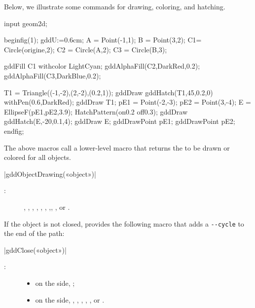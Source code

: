 \documentclass[a4paper,english]{article}
\begin{document}
Below, we illustrate some commands for drawing, coloring, and hatching.

\begin{ExempleMP}
input geom2d;

beginfig(1);
gddU:=0.6cm;
A = Point(-1,1); B = Point(3,2);
C1= Circle(origine,2);
C2 = Circle(A,2); C3 = Circle(B,3);

gddFill C1 withcolor LightCyan;
gddAlphaFill(C2,DarkRed,0.2);
gddAlphaFill(C3,DarkBlue,0.2);

T1 = Triangle((-1,-2),(2,-2),(0.2,1));
gddDraw gddHatch(T1,45,0.2,0) withPen(0.6,DarkRed);
gddDraw T1;
pE1 = Point(-2,-3); 
pE2 = Point(3,-4); 
E = EllipseF(pE1,pE2,3.9);
HatchPattern(on0.2 off0.3);
gddDraw gddHatch(E,-20,0.1,4);
gddDraw E;
gddDrawPoint pE1; gddDrawPoint pE2;
endfig;
\end{ExempleMP}


The above macros call a lower-level macro that returns the  to be drawn or colored for all \mpgeomdd objects.

\begin{colourband}
\macro|gddObjectDrawing(«object»)|
\begin{description}
  \item[:]
   , , ,
   , , , ,, , or
  .
\end{description}
\end{colourband}

If the object is not closed, \mpgeomdd provides the following macro that adds a
\lstinline+--cycle+ to the end of the path:
\begin{colourband}
\macro|gddClose(«object»)|
\begin{description}
  \item[:]
  \begin{itemize}
    \item on the \MP side, ;
    \item on the \mpgeomdd side, , , ,
   , , or
  .
  \end{itemize}
\end{description}
\end{colourband}
\end{document}
